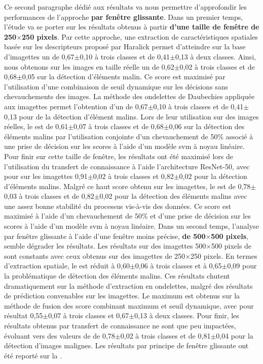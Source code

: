 Ce second paragraphe dédié aux résultats va nous permettre d'approfondir les performances de l'approche \textbf{par fenêtre glissante}. Dans un premier temps, l'étude va se porter sur les résultats obtenus à partir\textbf{ d'une taille de fenêtre de 250$\times$250 pixels}. Par cette approche, une extraction de caractéristiques spatiales basée sur les descripteurs proposé par Haralick permet d'atteindre sur la base d'imagettes un \fscore{} de 0,67$\pm$0,10 à trois classes et de 0,41$\pm$0,13 à deux classes. Ainsi, nous obtenons sur les images en taille réelle un \fscore{} de 0,62$\pm$0,02 à trois classes et de 0,68$\pm$0,05 sur la détection d'éléments malin. Ce score est maximisé par l'utilisation d'une combinaison de seuil dynamique sur les décisions sans chevauchements des images. La méthode des ondelettes de Daubechies appliquée aux imagettes permet l'obtention d'un \fscore{} de 0,67$\pm$0,10 à trois classes et de 0,41$\pm$0,13 pour de la détection d'élément malins. Lors de leur utilisation sur des images réelles, le \fscore{} est de 0,61$\pm$0,07 à trois classes et de 0,68$\pm$0,06 sur la détection des éléments malins par l'utilisation conjointe d'un chevauchement de 50\% associé à une prise de décision sur les scores à l'aide d'un modèle \gls{svm} à noyau linéaire. Pour finir sur cette taille de fenêtre, les résultats ont été maximisé lors de l'utilisation du transfert de connaissance à l'aide l'architecture ResNet-50, avec pour \fscore{} sur les imagettes 0,91$\pm$0,02 à trois classes et 0,82$\pm$0,02 pour la détection d'éléments malins. Malgré ce haut score obtenu sur les imagettes, le \fscore{} est de 0,78$\pm$0,03 à trois classes et de 0,82$\pm$0,02 pour la détection des éléments malins avec une assez bonne stabilité du processus vis-à-vis des données. Ce score est maximisé à l'aide d'un chevauchement de 50\% et d'une prise de décision sur les scores à l'aide d'un modèle \gls{svm} à noyau linéaire. Dans un second temps, l'analyse par fenêtre glissante à l'aide d'une fenêtre moins précise, \textbf{de 500$\times$500 pixels}, semble dégrader les résultats. Les résultats sur des imagettes 500$\times$500 pixels de sont constants avec ceux obtenus sur des imagettes de 250$\times$250 pixels. En termes d'extraction spatiale, le \fscore{} est réduit à 0,60$\pm$0,06 à trois classes et à 0,65$\pm$0,09 pour la problématique de détection des éléments malins. Ces résultats chutent dramatiquement sur la méthode d'extraction en ondelettes, malgré des résultats de prédiction convenables sur les imagettes. Le \fscore{} maximum est obtenus sur la méthode de fusion des score combinant maximum et seuil dynamique, avec pour résultat 0,55$\pm$0,07 à trois classes et 0,67$\pm$0,13 à deux classes. Pour finir, les résultats obtenus par transfert de connaissance ne sont que peu impactées, évoluant vers des valeurs de \fscore{} de 0,78$\pm$0,02 à trois classes et de 0,81$\pm$0,04 pour la détection d'images malignes. Les résultats par principe de fenêtre glissante ont été reporté sur la .\par

